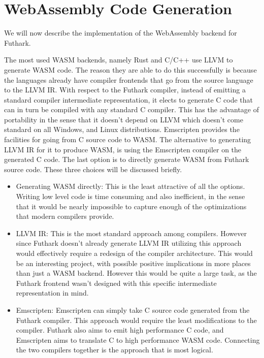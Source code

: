 \documentclass[11pt]{book}
\begin{document}

\section{WebAssembly Code Generation}

We will now describe the implementation of the WebAssembly backend for Futhark.

The most used WASM backends, namely Rust and C/C++ use LLVM to generate WASM code. The reason they are able to do this successfully is because the languages already have compiler frontends that go from the source language to the LLVM IR. With respect to the Futhark compiler, instead of emitting a standard compiler intermediate representation, it elects to generate C code that can in turn be compiled with any standard C compiler. This has the advantage of portability in the sense that it doesn't depend on LLVM which doesn't come standard on all Windows, and Linux distributions. 
Emscripten provides the facilities for going from C source code to WASM. The alternative to generating LLVM IR for it to produce WASM, is using the Emscripten compiler on the generated C code. The last option is to directly generate WASM from Futhark source code. These three choices will be discussed briefly.

\begin{itemize}
    \item Generating WASM directly: 
        This is the least attractive of all the options. Writing low level code is time consuming and also inefficient, in the sense that it would be nearly impossible to capture enough of the optimizations that modern compilers provide.
    \item LLVM IR: This is the most standard approach among compilers. However since Futhark doesn't already generate LLVM IR utilizing this approach would effectively require a redesign of the compiler architecture. This would be an interesting project, with possible positive implications in more places than just a WASM backend. However this would be quite a large task, as the Futhark frontend wasn't designed with this specific intermediate representation in mind. 
    \item Emscripten: Emscripten can simply take C source code generated from the Futhark compiler. This approach would require the least modifications to the compiler. Futhark also aims to emit high performance C code, and Emscripten aims to translate C to high performance WASM code. Connecting the two compilers together is the approach that is most logical.
\end{itemize}
\end{document}

